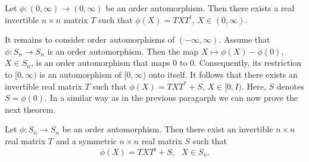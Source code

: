 \documentclass{article}
\begin{document}
\begin{theorem}
Let $\phi : (0, \infty ) \to (0, \infty)$ be an order automorphism. Then there exists a real invertible $n \times n$ matrix $T$ such that $\phi (X) = TXT^t$, $X \in (0, \infty)$.
\end{theorem}


It remains to consider order automorphisms of $(-\infty, \infty )$. Assume that $\phi: S_n \to S_n$ is an order automorphism. Then the map $X \mapsto \phi (X) - \phi (0)$, $X \in S_n$, is an order automorphism that maps $0$ to $0$. Consequently, its restriction to $[0, \infty)$ is an automorphism of $[0, \infty)$ onto itself. It follows that there exists an invertible real matrix $T$ such that $\phi (X) = TXT^\ast + S$, $X \in [0,I)$. Here, $S$ denotes $S= \phi (0)$. In a similar way as in the previous paragarph we can now prove the next theorem.

\begin{theorem}
Let $\phi : S_n \to S_n$ be an order automorphism. Then there exist an invertible $n \times n$ real matrix $T$ and a symmetric $n \times n$ real matrix $S$ such that
$$
\phi (X) = TXT^t + S, \ \ \ X \in S_n.
$$
\end{theorem}
\end{document}
